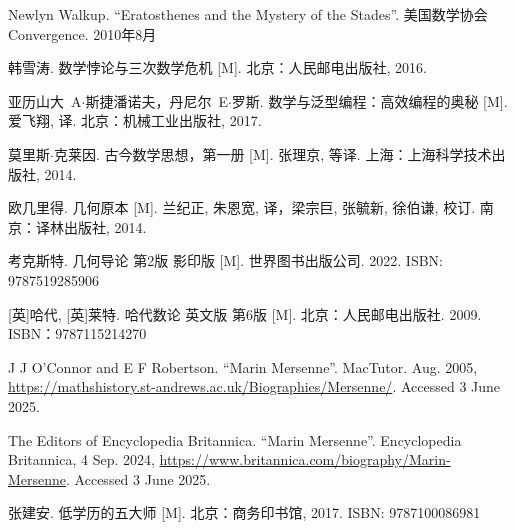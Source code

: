 Newlyn Walkup. ``Eratosthenes and the Mystery of the Stades''. 美国数学协会 Convergence. 2010年8月

韩雪涛. 数学悖论与三次数学危机 [M]. 北京：人民邮电出版社, 2016. %

亚历山大\ A$\cdot$斯捷潘诺夫，丹尼尔\ E$\cdot$罗斯. 数学与泛型编程：高效编程的奥秘 [M]. 爱飞翔, 译. 北京：机械工业出版社, 2017. %

莫里斯$\cdot$克莱因. 古今数学思想，第一册 [M]. 张理京, 等译. 上海：上海科学技术出版社, 2014. %

欧几里得. 几何原本 [M]. 兰纪正, 朱恩宽, 译，梁宗巨, 张毓新, 徐伯谦, 校订. 南京：译林出版社, 2014. %

考克斯特. 几何导论 第2版 影印版 [M]. 世界图书出版公司. 2022. ISBN: 9787519285906

[英]哈代, [英]莱特. 哈代数论 英文版 第6版 [M]. 北京：人民邮电出版社. 2009. ISBN：9787115214270

J J O'Connor and E F Robertson. ``Marin Mersenne''. MacTutor. Aug. 2005, \url{https://mathshistory.st-andrews.ac.uk/Biographies/Mersenne/}. Accessed 3 June 2025.

The Editors of Encyclopedia Britannica. ``Marin Mersenne''. Encyclopedia Britannica, 4 Sep. 2024, \url{https://www.britannica.com/biography/Marin-Mersenne}. Accessed 3 June 2025.

张建安. 低学历的五大师 [M]. 北京：商务印书馆, 2017. ISBN: 9787100086981
